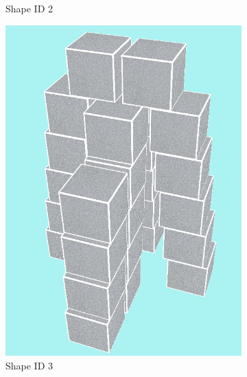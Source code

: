 \begin{figure}[!ht]
\begin{subfigure}{.29167\textwidth}
		\caption{Shape ID 2}
		\label{fig:qtp1-shape2}
	\end{subfigure}%
	\begin{subfigure}{.20833\textwidth}
		\centering
		\includegraphics[width=.95\linewidth]{figures/qtp1-shape3-model.png}
		\caption{Shape ID 3}
		\label{fig:qtp1-shape3-model}
	\end{subfigure}%
	\begin{subfigure}{.20833\textwidth}
		\centering

\end{subfigure}
\end{figure}

